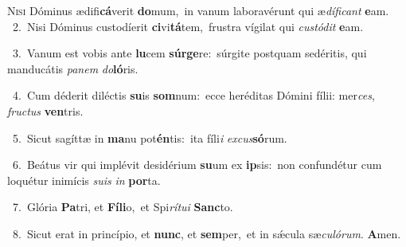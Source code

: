 \lettrine{\initial\textcolor{\initialcolor}{N}}{isi} Dóminus ædifi\-\textbf{cá}\-verit \textbf{do}\-mum,~\star in vanum laboravérunt qui æ\-\textit{dí}\-\textit{fi}\textit{cant} \textbf{e}\-am.\\
{\numbfont\textcolor{\numbcolor}{~2.}}~Nisi Dóminus custodíerit \textbf{ci}\-vi\-\textbf{tá}\-tem,~\star frustra vígilat qui \textit{cus}\-\textit{tó}\textit{dit} \textbf{e}\-am.\par
{\numbfont\textcolor{\numbcolor}{~3.}}~Vanum est vobis ante \textbf{lu}\-cem \textbf{súr}\-\textbf{ge}re:~\star súrgite postquam sedéritis, qui manducátis \textit{pa}\-\textit{nem} \textit{do}\-\textbf{ló}ris.\par
{\numbfont\textcolor{\numbcolor}{~4.}}~Cum déderit diléctis \textbf{su}\-is \textbf{som}\-num:~\star ecce heréditas Dómini fílii: mer\-\textit{ces}\-, \textit{fruc}\-\textit{tus} \textbf{ven}\-tris.\par
{\numbfont\textcolor{\numbcolor}{~5.}}~Sicut sagíttæ in \textbf{ma}\-nu pot\-\textbf{én}\-tis:~\star ita fíli\textit{i} \textit{ex}\-\textit{cus}\textbf{só}rum.\par
{\numbfont\textcolor{\numbcolor}{~6.}}~Beátus vir qui implévit desidérium \textbf{su}\-um ex \textbf{ip}\-sis:~\star non confundétur cum loquétur inimícis \textit{su}\-\textit{is} \textit{in} \textbf{por}\-ta.\par
{\numbfont\textcolor{\numbcolor}{~7.}}~Glória \textbf{Pa}\-tri, et \textbf{Fí}\-\textbf{li}o,~\star et Spi\-\textit{rí}\-\textit{tu}\textit{i} \textbf{Sanc}\-to.\par
{\numbfont\textcolor{\numbcolor}{~8.}}~Sicut erat in princípio, et \textbf{nunc}\-, et \textbf{sem}\-per,~\star et in sǽcula sæ\-\textit{cu}\-\textit{ló}\textit{rum}. \textbf{A}\-men.\par
